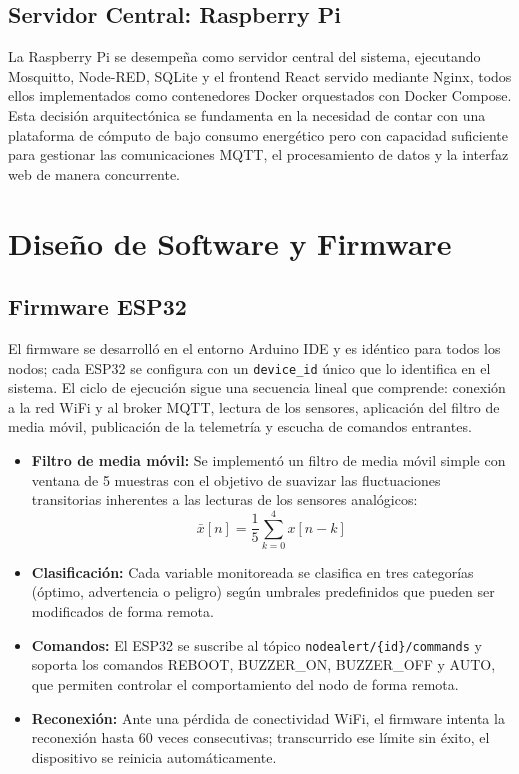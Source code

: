 \documentclass[11pt,a4paper]{article}
\begin{document}
\subsection{Servidor Central: Raspberry Pi}
La Raspberry Pi se desempe\~na como servidor central del sistema, ejecutando Mosquitto, Node-RED, SQLite y el frontend React servido mediante Nginx, todos ellos implementados como contenedores Docker orquestados con Docker Compose. Esta decisi\'on arquitect\'onica se fundamenta en la necesidad de contar con una plataforma de c\'omputo de bajo consumo energ\'etico pero con capacidad suficiente para gestionar las comunicaciones MQTT, el procesamiento de datos y la interfaz web de manera concurrente.

\section{Dise\~no de Software y Firmware}

\subsection{Firmware ESP32}
El firmware se desarroll\'o en el entorno Arduino IDE y es id\'entico para todos los nodos; cada ESP32 se configura con un \texttt{device\_id} \'unico que lo identifica en el sistema. El ciclo de ejecuci\'on sigue una secuencia lineal que comprende: conexi\'on a la red WiFi y al broker MQTT, lectura de los sensores, aplicaci\'on del filtro de media m\'ovil, publicaci\'on de la telemetr\'ia y escucha de comandos entrantes.

\begin{itemize}
    \item \textbf{Filtro de media m\'ovil:} Se implement\'o un filtro de media m\'ovil simple con ventana de 5 muestras con el objetivo de suavizar las fluctuaciones transitorias inherentes a las lecturas de los sensores anal\'ogicos:
    \[
    \bar{x}[n] = \frac{1}{5} \sum_{k=0}^{4} x[n-k]
    \]
    \item \textbf{Clasificaci\'on:} Cada variable monitoreada se clasifica en tres categor\'ias (\'optimo, advertencia o peligro) seg\'un umbrales predefinidos que pueden ser modificados de forma remota.
    \item \textbf{Comandos:} El ESP32 se suscribe al t\'opico \texttt{nodealert/\{id\}/commands} y soporta los comandos REBOOT, BUZZER\_ON, BUZZER\_OFF y AUTO, que permiten controlar el comportamiento del nodo de forma remota.
    \item \textbf{Reconexi\'on:} Ante una p\'erdida de conectividad WiFi, el firmware intenta la reconexi\'on hasta 60 veces consecutivas; transcurrido ese l\'imite sin \'exito, el dispositivo se reinicia autom\'aticamente.
\end{itemize}
\end{document}
